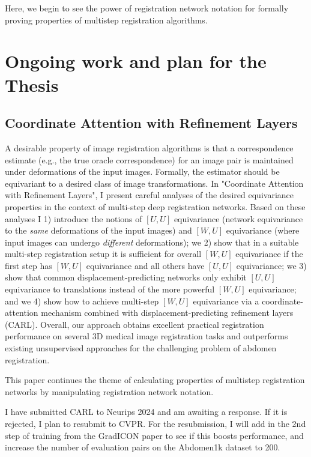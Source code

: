 \documentclass{article}
\begin{document}
Here, we begin to see the power of registration network notation for formally
proving properties of multistep registration algorithms.
\section{Ongoing work and plan for the Thesis}

\subsection{Coordinate Attention with Refinement Layers}

A desirable property of image registration algorithms is that a correspondence estimate (e.g., the true oracle correspondence) for an image pair is maintained under deformations of the input images. Formally, the estimator should be equivariant to a desired class of image transformations. In "Coordinate Attention with Refinement Layers", I  present careful analyses of the desired equivariance properties in the context of multi-step deep registration networks. Based on these analyses I 1) introduce the notions of $[U,U]$ equivariance (network equivariance to the \emph{same} deformations of the input images) and $[W,U]$ equivariance (where input images can undergo \emph{different} deformations); we 2) show that in a suitable multi-step registration setup it is sufficient for overall $[W,U]$ equivariance if the first step has $[W,U]$ equivariance and all others have $[U,U]$ equivariance; we 3) show that common displacement-predicting networks only exhibit $[U,U]$ equivariance to translations instead of the more powerful $[W,U]$ equivariance; and we 4) show how to achieve multi-step $[W,U]$ equivariance via a coordinate-attention mechanism combined with displacement-predicting refinement layers (CARL). Overall, our approach obtains excellent practical registration performance on several 3D medical image registration tasks and outperforms existing unsupervised approaches for the challenging problem of abdomen registration.

This paper continues the theme of calculating properties of multistep
registration networks by manipulating registration network notation.

I have submitted CARL to Neurips 2024 and am awaiting a response. If it is
rejected, I plan to resubmit to CVPR. For the resubmission, I will add in the 2nd step of training from the GradICON paper to see if this boosts performance, and increase the number of evaluation pairs on the Abdomen1k dataset to 200.
\end{document}
